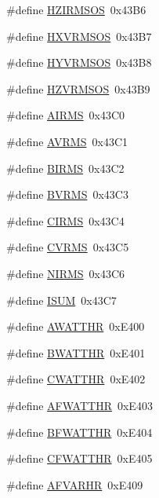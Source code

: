 \begin{DoxyCompactItemize}
\item 
\#define \hyperlink{a00036_a1deadee161ae214be5ccc72f76eade2d}{H\-Z\-I\-R\-M\-S\-O\-S}~0x43\-B6
\item 
\#define \hyperlink{a00036_a88614989eb05e4e7fb74c61d77e33abf}{H\-X\-V\-R\-M\-S\-O\-S}~0x43\-B7
\item 
\#define \hyperlink{a00036_a0c59a0da73c75a4cd6ef298a5e866763}{H\-Y\-V\-R\-M\-S\-O\-S}~0x43\-B8
\item 
\#define \hyperlink{a00036_afc76ca3b28d691349fc61030311acc53}{H\-Z\-V\-R\-M\-S\-O\-S}~0x43\-B9
\item 
\#define \hyperlink{a00036_afae37e821d8947e31a63759e4bb57355}{A\-I\-R\-M\-S}~0x43\-C0
\item 
\#define \hyperlink{a00036_ae4c7fedd5702010e6907a686a35c1fa8}{A\-V\-R\-M\-S}~0x43\-C1
\item 
\#define \hyperlink{a00036_ae1cff66a3f5c466b4344a5c2781224df}{B\-I\-R\-M\-S}~0x43\-C2
\item 
\#define \hyperlink{a00036_a09f7027a92ccae6bb9b5738d5bc185f3}{B\-V\-R\-M\-S}~0x43\-C3
\item 
\#define \hyperlink{a00036_a3ccd0ef2a55b24f358292694724d37a3}{C\-I\-R\-M\-S}~0x43\-C4
\item 
\#define \hyperlink{a00036_a61e9291ce0829a45cee1ee9a5f3ea4f7}{C\-V\-R\-M\-S}~0x43\-C5
\item 
\#define \hyperlink{a00036_a38f6f388b7b5c65b2d453384a25f6773}{N\-I\-R\-M\-S}~0x43\-C6
\item 
\#define \hyperlink{a00036_ac84c4287f80dc29bdec129d9058180a8}{I\-S\-U\-M}~0x43\-C7
\item 
\#define \hyperlink{a00036_ae66c97ed86f47fd938f143a30a8b2f7e}{A\-W\-A\-T\-T\-H\-R}~0x\-E400
\item 
\#define \hyperlink{a00036_a185c6910fa47f7e973f0f8743ef0e8ad}{B\-W\-A\-T\-T\-H\-R}~0x\-E401
\item 
\#define \hyperlink{a00036_ad685baf76950c0387bedffa9bb3272a9}{C\-W\-A\-T\-T\-H\-R}~0x\-E402
\item 
\#define \hyperlink{a00036_a1d6ab78cdf0064670a1c70be56d5938c}{A\-F\-W\-A\-T\-T\-H\-R}~0x\-E403
\item 
\#define \hyperlink{a00036_a0d1650b78efb7f2dfd865537e925990a}{B\-F\-W\-A\-T\-T\-H\-R}~0x\-E404
\item 
\#define \hyperlink{a00036_a5289da5a579be5a0f44dfd8863ca67e8}{C\-F\-W\-A\-T\-T\-H\-R}~0x\-E405
\item 
\#define \hyperlink{a00036_a6689e366df3767252eee7ab18532dcee}{A\-F\-V\-A\-R\-H\-R}~0x\-E409

\end{DoxyCompactItemize}
